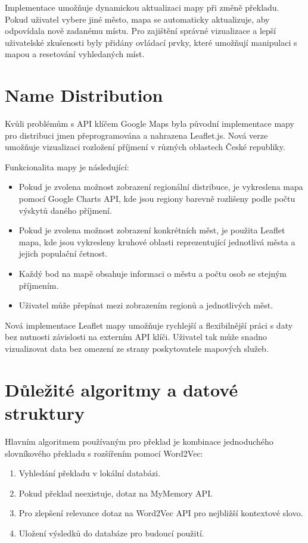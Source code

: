 \documentclass[czech, ba, kiv, he]{fasthesis}
\begin{document}
Implementace umožňuje dynamickou aktualizaci mapy při změně překladu. Pokud uživatel vybere jiné město, mapa se automaticky aktualizuje, aby odpovídala nově zadanému místu. Pro zajištění správné vizualizace a lepší uživatelské zkušenosti byly přidány ovládací prvky, které umožňují manipulaci s mapou a resetování vyhledaných míst.

\section{Name Distribution}
Kvůli problémům s API klíčem Google Maps byla původní implementace mapy pro distribuci jmen přeprogramována a nahrazena Leaflet.js. Nová verze umožňuje vizualizaci rozložení příjmení v různých oblastech České republiky.

Funkcionalita mapy je následující:
\begin{itemize}
\item Pokud je zvolena možnost zobrazení regionální distribuce, je vykreslena mapa pomocí Google Charts API, kde jsou regiony barevně rozlišeny podle počtu výskytů daného příjmení.
\item Pokud je zvolena možnost zobrazení konkrétních měst, je použita Leaflet mapa, kde jsou vykresleny kruhové oblasti reprezentující jednotlivá města a jejich populační četnost.
\item Každý bod na mapě obsahuje informaci o městu a počtu osob se stejným příjmením.
\item Uživatel může přepínat mezi zobrazením regionů a jednotlivých měst.
\end{itemize}

Nová implementace Leaflet mapy umožňuje rychlejší a flexibilnější práci s daty bez nutnosti závislosti na externím API klíči. Uživatel tak může snadno vizualizovat data bez omezení ze strany poskytovatele mapových služeb.

\section{Důležité algoritmy a datové struktury}
Hlavním algoritmem používaným pro překlad je kombinace jednoduchého slovníkového překladu s rozšířením pomocí Word2Vec:

\begin{enumerate}
    \item Vyhledání překladu v lokální databázi.
    \item Pokud překlad neexistuje, dotaz na MyMemory API.
    \item Pro zlepšení relevance dotaz na Word2Vec API pro nejbližší kontextové slovo.
    \item Uložení výsledků do databáze pro budoucí použití.
\end{enumerate}
\end{document}
